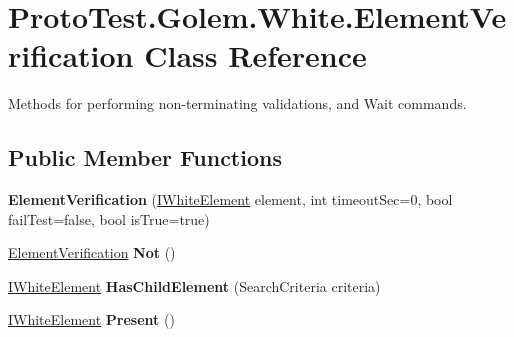 \hypertarget{class_proto_test_1_1_golem_1_1_white_1_1_element_verification}{\section{Proto\-Test.\-Golem.\-White.\-Element\-Verification Class Reference}
\label{class_proto_test_1_1_golem_1_1_white_1_1_element_verification}
}


Methods for performing non-\/terminating validations, and Wait commands.  


\subsection*{Public Member Functions}
\begin{DoxyCompactItemize}
\item 
\hypertarget{class_proto_test_1_1_golem_1_1_white_1_1_element_verification_a7674e2bb3031fa6f0460ff41b5042077}{{\bfseries Element\-Verification} (\hyperlink{interface_proto_test_1_1_golem_1_1_white_1_1_elements_1_1_i_white_element}{I\-White\-Element} element, int timeout\-Sec=0, bool fail\-Test=false, bool is\-True=true)}\label{class_proto_test_1_1_golem_1_1_white_1_1_element_verification_a7674e2bb3031fa6f0460ff41b5042077}

\item 
\hypertarget{class_proto_test_1_1_golem_1_1_white_1_1_element_verification_a8c5191665956d91311696cdb674d8440}{\hyperlink{class_proto_test_1_1_golem_1_1_white_1_1_element_verification}{Element\-Verification} {\bfseries Not} ()}\label{class_proto_test_1_1_golem_1_1_white_1_1_element_verification_a8c5191665956d91311696cdb674d8440}

\item 
\hypertarget{class_proto_test_1_1_golem_1_1_white_1_1_element_verification_aabea67d39c1fda086e6bbe01be239d5d}{\hyperlink{interface_proto_test_1_1_golem_1_1_white_1_1_elements_1_1_i_white_element}{I\-White\-Element} {\bfseries Has\-Child\-Element} (Search\-Criteria criteria)}\label{class_proto_test_1_1_golem_1_1_white_1_1_element_verification_aabea67d39c1fda086e6bbe01be239d5d}

\item 
\hypertarget{class_proto_test_1_1_golem_1_1_white_1_1_element_verification_a307885ac1b2fdcf07db70d61fae0b4b1}{\hyperlink{interface_proto_test_1_1_golem_1_1_white_1_1_elements_1_1_i_white_element}{I\-White\-Element} {\bfseries Present} ()}\label{class_proto_test_1_1_golem_1_1_white_1_1_element_verification_a307885ac1b2fdcf07db70d61fae0b4b1}


\end{DoxyCompactItemize}
